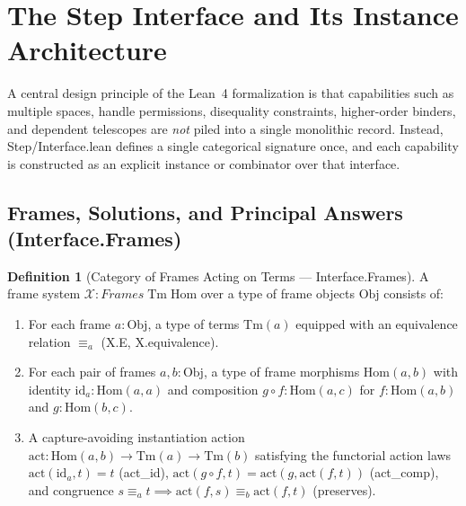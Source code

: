 \documentclass[11pt,a4paper]{article}
\theoremstyle{definition}
\newtheorem{definition}[theorem]{Definition}
\DeclareRobustCommand{\lean}[1]{%
  \ifmmode\text{\normalfont\ttfamily\footnotesize\detokenize{#1}}%
  \else{\normalfont\footnotesize\leanurl{#1}}\fi}
\def\lean#1{#1}%
\begin{document}
\section{The Step Interface and Its Instance Architecture}
\label{sec:interface}

A central design principle of the Lean~4 formalization is that capabilities such as multiple spaces, handle permissions, disequality constraints, higher-order binders, and dependent telescopes are \emph{not} piled into a single monolithic record. Instead, \lean{Step/Interface.lean} defines a single categorical signature once, and each capability is constructed as an explicit instance or combinator over that interface.

\subsection{Frames, Solutions, and Principal Answers (\lean{Interface.Frames})}

\begin{definition}[Category of Frames Acting on Terms --- \lean{Interface.Frames}]
\label{def:frames}
A frame system $\mathcal{X} : \lean{Frames}\;\mathrm{Tm}\;\mathrm{Hom}$ over a type of frame objects $\mathrm{Obj}$ consists of:
\begin{enumerate}[leftmargin=2em, nosep]
  \item For each frame $a : \mathrm{Obj}$, a type of terms $\mathrm{Tm}(a)$ equipped with an equivalence relation $\equiv_a$ (\lean{X.E}, \lean{X.equivalence}).
  \item For each pair of frames $a, b : \mathrm{Obj}$, a type of frame morphisms $\mathrm{Hom}(a, b)$ with identity $\mathrm{id}_a : \mathrm{Hom}(a, a)$ and composition $g \circ f : \mathrm{Hom}(a, c)$ for $f : \mathrm{Hom}(a, b)$ and $g : \mathrm{Hom}(b, c)$.
  \item A capture-avoiding instantiation action $\mathrm{act} : \mathrm{Hom}(a, b) \to \mathrm{Tm}(a) \to \mathrm{Tm}(b)$ satisfying the functorial action laws $\mathrm{act}(\mathrm{id}_a, t) = t$ (\lean{act_id}), $\mathrm{act}(g \circ f, t) = \mathrm{act}(g, \mathrm{act}(f, t))$ (\lean{act_comp}), and congruence $s \equiv_a t \implies \mathrm{act}(f, s) \equiv_b \mathrm{act}(f, t)$ (\lean{preserves}).
\end{enumerate}
\end{definition}
\end{document}
